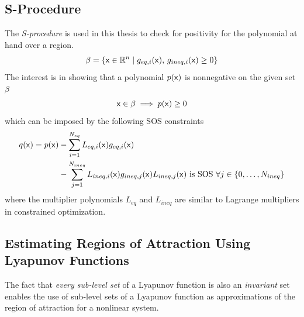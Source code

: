 

\subsection{S-Procedure}
\label{sec:s-procedure}

The \textit{S-procedure} is used in this thesis to check for positivity for the
polynomial at hand over a region.
\[
  \beta = \lbrace{\mathbf{\mathsf{x}}} \in \mathbb{R}^n \mid g_{eq,i}({\mathbf{\mathsf{x}}}),\,g_{ineq,i}({\mathbf{\mathsf{x}}})
    \geq 0\rbrace
\]
The interest is in showing that a polynomial \(p({\mathbf{\mathsf{x}}})\) is nonnegative on
the given set \(\beta\) \ie
\[
  {\mathbf{\mathsf{x}}} \in \beta \implies p({\mathbf{\mathsf{x}}}) \geq 0
\]
which can be imposed by the following SOS constraints
\begin{align*}
  q({\mathbf{\mathsf{x}}}) = p({\mathbf{\mathsf{x}}}) &- \sum_{i=1}^{N_{eq}}L_{eq,i}({\mathbf{\mathsf{x}}})g_{eq,i}({\mathbf{\mathsf{x}}}) \\ &-
                                                                                            \sum_{j=1}^{N_{ineq}}L_{ineq,i}({\mathbf{\mathsf{x}}})g_{ineq,j}({\mathbf{\mathsf{x}}})
                                                                                            L_{ineq,j}({\mathbf{\mathsf{x}}}) \text{ is SOS } \forall j \in \lbrace0,\ldots,N_{ineq}\rbrace
\end{align*} 
where the multiplier polynomials \(L_{eq}\) and \(L_{ineq}\) are similar to
Lagrange multipliers in constrained optimization.

\subsection{Estimating Regions of Attraction Using Lyapunov Functions}

The fact that \textit{every sub-level set} of a Lyapunov function is also an
\textit{invariant} set enables the use of sub-level sets of a Lyapunov function
as approximations of the region of attraction for a nonlinear system.

